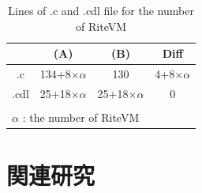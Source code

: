 \documentclass[submit]{ipsj_v2/UTF8/ipsj}
\begin{document}

\begin{table}[t]
    \centering
    \caption{Lines of .c and .cdl file for the number of RiteVM}
    \begin{tabular}{c||cc|c}
                & (A)       & (B)     & Diff  \\ \hline
        .c      & 134$+$8$\times$$\alpha $  & 130     & 4$+$8$\times$$\alpha$ \\
        .cdl    & 25$+$18$\times$$\alpha$   & 25$+$18$\times$$\alpha$ & 0     \\
        \multicolumn{3}{l}{  }\\
        \multicolumn{3}{l}{{\small $\alpha$} : {\scriptsize the number of RiteVM}}
    \end{tabular}
    \label{tab:codesize}
\end{table}

\section{関連研究}
\label{sec:Related Work}
\end{document}
